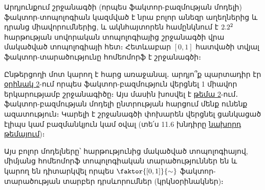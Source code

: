 \documentclass[./main.tex]{subfiles}
\begin{document}
\begin{example}
\par Արդյունքում շրջանագծի (որպես ֆակտոր-բազմության մոդելի) ֆակտոր-տոպո\-լո\-գիան կազմված է նրա բոլոր անեզր աղեղներից և դրանց միավորումներից, և ակն\-հայ\-տո\-րեն համընկնում է $2.2^2$ հարթության սովորական տոպոլոգիայից շրջանա\-գծի վրա մակածված տոպոլոգիայի հետ։ Հետևաբար $[0, 1]$ հատվածի տվյալ ֆակ\-տոր-տարածությունը հոմեոմորֆ է շրջանագծի։
\end{example}

\newpage

\begin{note}
\par Ընթերցողի մոտ կարող է հարց առաջանալ․ արդյո՞ք պարտադիր էր \hyperref[ch12ex2]{օրինակ 2}-ում որպես ֆակտոր-բազմություն վերցնել 1 միավոր երկարությամբ շրջանագիծը։ Այս մասին խոսվել է \hyperref[sec:2]{թեմա 2}-ում․ ֆակտոր-բազմության մոդելի ընտ\-րու\-թյան հարցում մենք ունենք ազատություն։ Կարելի է շրջանագծի փոխարեն վերց\-նել ցանկացած էլիպս կամ բազմանկյուն կամ օվալ (տե՛ս 11.6 խնդիրը \hyperref[sec:11]{նախորդ թեմայում})։ 

\par Այս բոլոր մոդելները՝ հարթությունից մակածված տոպոլո\-գիայով, միմյանց հո\-մեո\-մորֆ տոպոլոգիական տարածություններ են և կարող են դիտարկվել որպես $\faktor{[0,1]}{\sim}$ ֆակտոր-տարածության տարբեր դրսևորումներ (կրկնօրինակներ)։
\end{note}





\end{document}
